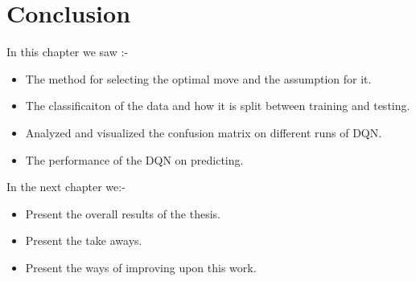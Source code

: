 \section{Conclusion}
In this chapter we saw :-
\begin{itemize}
    \item The method for selecting the optimal move and the assumption for it.
    \item The classificaiton of the data and how it is split between training and testing.
    \item Analyzed and visualized the confusion matrix on different runs of DQN.
    \item The performance of the DQN on predicting.
\end{itemize}
In the next chapter we:-
\begin{itemize}
    \item Present the overall results of the thesis.
    \item Present the take aways.
    \item Present the ways of improving upon this work.
\end{itemize}
